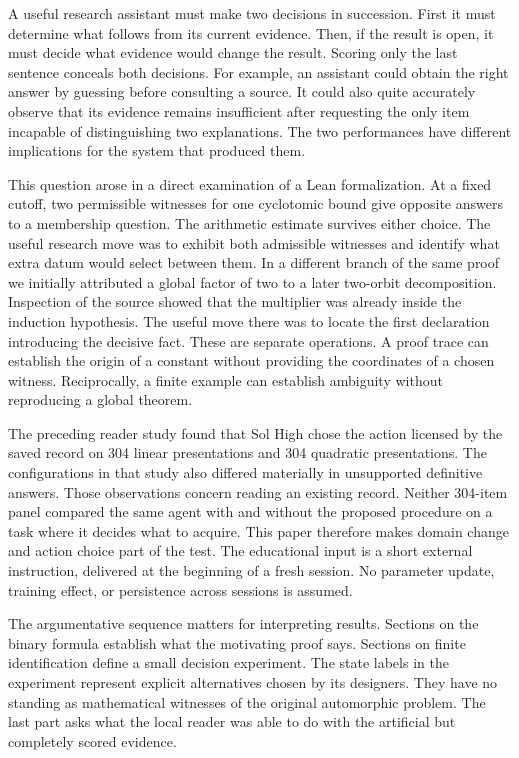\documentclass[12pt,letterpaper]{article}
\begin{document}
A useful research assistant must make two decisions in succession. First it must determine what follows from its current evidence. Then, if the result is open, it must decide what evidence would change the result. Scoring only the last sentence conceals both decisions. For example, an assistant could obtain the right answer by guessing before consulting a source. It could also quite accurately observe that its evidence remains insufficient after requesting the only item incapable of distinguishing two explanations. The two performances have different implications for the system that produced them.

This question arose in a direct examination of a Lean formalization. At a fixed cutoff, two permissible witnesses for one cyclotomic bound give opposite answers to a membership question. The arithmetic estimate survives either choice. The useful research move was to exhibit both admissible witnesses and identify what extra datum would select between them. In a different branch of the same proof we initially attributed a global factor of two to a later two-orbit decomposition. Inspection of the source showed that the multiplier was already inside the induction hypothesis. The useful move there was to locate the first declaration introducing the decisive fact. These are separate operations. A proof trace can establish the origin of a constant without providing the coordinates of a chosen witness. Reciprocally, a finite example can establish ambiguity without reproducing a global theorem.

The preceding reader study found that Sol High chose the action licensed by the saved record on 304 linear presentations and 304 quadratic presentations. The configurations in that study also differed materially in unsupported definitive answers. Those observations concern reading an existing record. Neither 304-item panel compared the same agent with and without the proposed procedure on a task where it decides what to acquire. This paper therefore makes domain change and action choice part of the test. The educational input is a short external instruction, delivered at the beginning of a fresh session. No parameter update, training effect, or persistence across sessions is assumed.

The argumentative sequence matters for interpreting results. Sections on the binary formula establish what the motivating proof says. Sections on finite identification define a small decision experiment. The state labels in the experiment represent explicit alternatives chosen by its designers. They have no standing as mathematical witnesses of the original automorphic problem. The last part asks what the local reader was able to do with the artificial but completely scored evidence.
\end{document}
